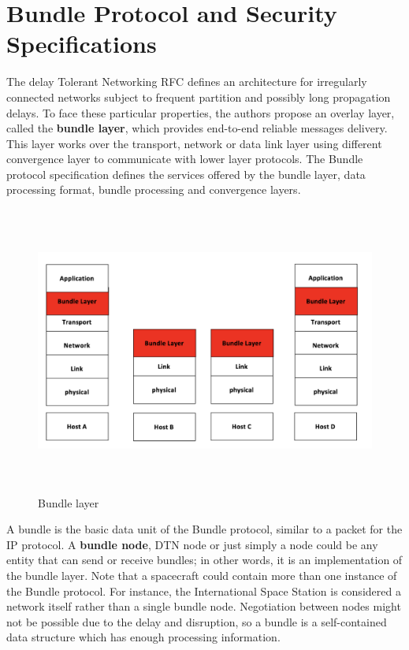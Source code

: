 \section{Bundle Protocol and Security Specifications}
\label{sec:dtn}

The delay Tolerant Networking RFC \cite{cerf2007delay} defines an architecture for irregularly connected networks subject to frequent partition and possibly long propagation delays. To face these particular properties, the authors propose an overlay layer, called the \textbf{bundle layer}, which provides end-to-end reliable messages delivery. This layer works over the transport, network or data link layer using different convergence layer to communicate with lower layer protocols. The Bundle protocol specification \cite{rfc5050} defines the services offered by the bundle layer, data processing format, bundle processing and convergence layers. 

\begin{figure}[ht]
\centering
\includegraphics[width=1 \linewidth, height=9.5cm]{images/bundle.png} 
\caption{Bundle layer}
\label{fig:bundle}
\end{figure}

A bundle is the basic data unit of the Bundle protocol, similar to a packet for the IP protocol. A \textbf{bundle node}, DTN node or just simply a node could be any entity that can send or receive bundles; in other words, it is an implementation of the bundle layer. Note that a spacecraft could contain more than one instance of the Bundle protocol. For instance, the International Space Station is considered a network itself rather than a single bundle node. Negotiation between nodes might not be possible due to the delay and disruption, so a bundle is a self-contained data structure which has enough processing information.


